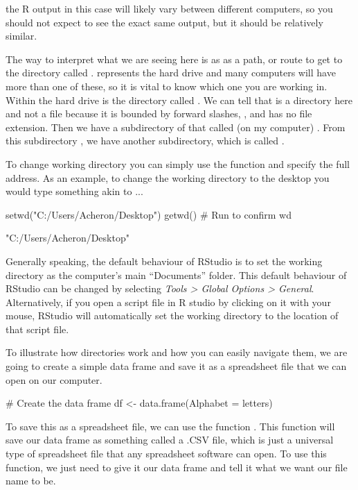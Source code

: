 \noindent the R output in this case will likely vary between different computers, so you should not expect to see the exact same output, but it should be relatively similar.

The way to interpret what we are seeing here is as as a path, or route to get to the directory called .  represents the hard drive and many computers will have more than one of these, so it is vital to know which one you are working in. Within the hard drive is the directory called . We can tell that  is a directory here and not a file because it is bounded by forward slashes, \R{/}, and has no file extension. Then we have a subdirectory of that called (on my computer) .  From this subdirectory , we have another subdirectory, which is called .

To change working directory you can simply use the function  and specify the full address. As an example, to change the working directory to the desktop you would type something akin to ...

\begin{inR}
setwd("C:/Users/Acheron/Desktop")
getwd() # Run to confirm wd
\end{inR}

\begin{outR}
[1] "C:/Users/Acheron/Desktop"
\end{outR}

Generally speaking, the default behaviour of RStudio is to set the working directory as the computer's main ``Documents'' folder. This default behaviour of RStudio can be changed by selecting \textit{Tools > Global Options > General}. Alternatively, if you open a script file in R studio by clicking on it with your mouse, RStudio will automatically set the working directory to the location of that script file.

To illustrate how directories work and how you can easily navigate them, we are going to create a simple data frame and save it as a spreadsheet file that we can open on our computer.

\begin{inR}
# Create the data frame
df <- data.frame(Alphabet = letters)
\end{inR}

\noindent
To save this as a spreadsheet file, we can use the function . This function will save our data frame as something called a .CSV file, which is just a universal type of spreadsheet file that any spreadsheet software can open. To use this function, we just need to give it our data frame and tell it what we want our file name to be.

